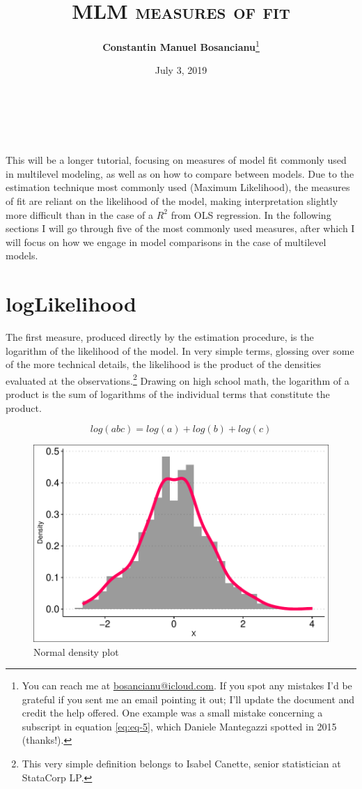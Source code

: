 \documentclass[12pt,english]{article}\usepackage[]{graphicx}\usepackage[usenames, dvipsnames]{xcolor}
\title{\textsc{MLM measures of fit}}
\author{\textbf{Constantin Manuel Bosancianu}\footnote{You can reach me at \href{mailto:bosancianu@icloud.com}{bosancianu@icloud.com}. If you spot any mistakes I'd be grateful if you sent me an email pointing it out; I'll update the document and credit the help offered. One example was a small mistake concerning a subscript in equation \ref{eq:eq-5}, which Daniele Mantegazzi spotted in 2015 (thanks!).}}
\affil{WZB Berlin Social Science Center \\ \textit{Institutions and Political Inequality}}
\date{July 3, 2019}
\makeatletter
\renewcommand{\maketitle}{
  \begin{flushleft}
    {\huge\@title}\\
    \vspace{10pt}
    {\large\@author}\\
    {\@date}
    \vspace{40pt}
  \end{flushleft}
}
\makeatother
\begin{document}
\maketitle

This will be a longer tutorial, focusing on measures of model fit commonly used in multilevel modeling, as well as on how to compare between models. Due to the estimation technique most commonly used (Maximum Likelihood), the measures of fit are reliant on the likelihood of the model, making interpretation slightly more difficult than in the case of a $R^2$ from OLS regression. In the following sections I will go through five of the most commonly used measures, after which I will focus on how we engage in model comparisons in the case of multilevel models.




\section{logLikelihood}
The first measure, produced directly by the estimation procedure, is the logarithm of the likelihood of the model. In very simple terms, glossing over some of the more technical details, the likelihood is the product of the densities evaluated at the observations.\footnote{This very simple definition belongs to Isabel Canette, senior statistician at StataCorp LP.} Drawing on high school math, the logarithm of a product is the sum of logarithms of the individual terms that constitute the product.

\begin{equation}
\label{eq:eq-1}
log(abc)=log(a)+log(b)+log(c)
\end{equation}






\begin{figure}[!ht]
\centering
\includegraphics[width=0.6\linewidth]{../../05-graphs/Supplem-01}
\caption[Normal density plot]{Normal density plot}
\label{fig:fig-1}
\end{figure}
\end{document}
